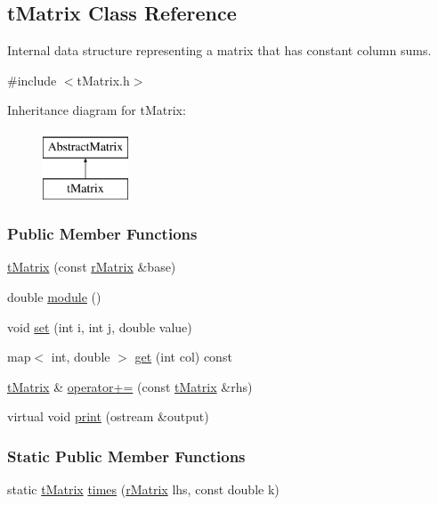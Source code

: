 \hypertarget{classt_matrix}{\subsection{t\+Matrix Class Reference}
\label{classt_matrix}
}


Internal data structure representing a matrix that has constant column sums.  




{\ttfamily \#include $<$t\+Matrix.\+h$>$}

Inheritance diagram for t\+Matrix\+:\begin{figure}[H]
\begin{center}
\leavevmode
\includegraphics[height=2.000000cm]{classt_matrix}
\end{center}
\end{figure}
\subsubsection*{Public Member Functions}
\begin{DoxyCompactItemize}
\item 
\hyperlink{classt_matrix_a58e483fc473143ff57c2d821caf047e4}{t\+Matrix} (const \hyperlink{classr_matrix}{r\+Matrix} \&base)
\item 
double \hyperlink{classt_matrix_a98e50b73500855a69245ca57303085b1}{module} ()
\item 
void \hyperlink{classt_matrix_a52d5417362388c95db488ee6c8e008fa}{set} (int i, int j, double value)
\item 
map$<$ int, double $>$ \hyperlink{classt_matrix_a403a16974063512eb8c384f4b681d946}{get} (int col) const 
\item 
\hyperlink{classt_matrix}{t\+Matrix} \& \hyperlink{classt_matrix_a4308bb70d63f0301ca2e1fcacac77beb}{operator+=} (const \hyperlink{classt_matrix}{t\+Matrix} \&rhs)
\item 
virtual void \hyperlink{classt_matrix_a7e1b5623978bf16ace999ce22a28d350}{print} (ostream \&output)
\end{DoxyCompactItemize}
\subsubsection*{Static Public Member Functions}
\begin{DoxyCompactItemize}
\item 
static \hyperlink{classt_matrix}{t\+Matrix} \hyperlink{classt_matrix_aa782f22b376682aca4fd61ac9e6358e5}{times} (\hyperlink{classr_matrix}{r\+Matrix} lhs, const double k)
\end{DoxyCompactItemize}
